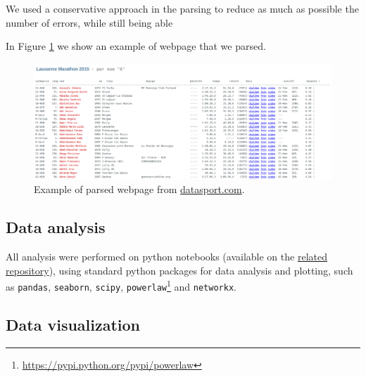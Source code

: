 \documentclass[fleqn,10pt]{wlscirep}
\begin{document}
        We used a conservative approach in the parsing to reduce as much as possible the number of errors, while still
        being able 

        In Figure \ref{fig:exParsing} we show an example of 
        webpage that we parsed. 

\begin{figure}[h!]
    \centering
    \includegraphics[scale=0.32]{Figures/exampleParsing.png}
    \caption{Example of parsed webpage from \url{datasport.com}.}
    \label{fig:exParsing}
\end{figure}

		
	
	
	\subsection*{Data analysis}
	
		All analysis were performed on python notebooks (available on the \href{related repository}{related repository}), using standard python packages for data analysis and plotting, such as \texttt{pandas}, \texttt{seaborn}, \texttt{scipy}, \texttt{powerlaw}\footnote{\url{https://pypi.python.org/pypi/powerlaw}} and \texttt{networkx}.
	
	
	\subsection*{Data visualization}		
	
\end{document}
